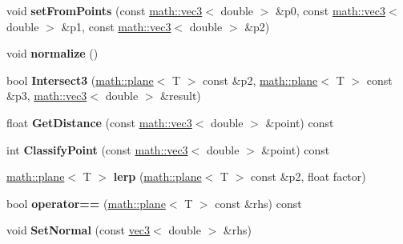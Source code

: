 \begin{DoxyCompactItemize}
\item 
\hypertarget{classmath_1_1plane_abeb813bf61a05280b9249a04f52f2d35}{
void {\bfseries setFromPoints} (const \hyperlink{classmath_1_1vec3}{math::vec3}$<$ double $>$ \&p0, const \hyperlink{classmath_1_1vec3}{math::vec3}$<$ double $>$ \&p1, const \hyperlink{classmath_1_1vec3}{math::vec3}$<$ double $>$ \&p2)}
\label{classmath_1_1plane_abeb813bf61a05280b9249a04f52f2d35}

\item 
\hypertarget{classmath_1_1plane_a0a5b678ea4760a4ce66d74ffa4daa1b3}{
void {\bfseries normalize} ()}
\label{classmath_1_1plane_a0a5b678ea4760a4ce66d74ffa4daa1b3}

\item 
\hypertarget{classmath_1_1plane_a1ceb4cac52134338f0676d8ef673cd25}{
bool {\bfseries Intersect3} (\hyperlink{classmath_1_1plane}{math::plane}$<$ T $>$ const \&p2, \hyperlink{classmath_1_1plane}{math::plane}$<$ T $>$ const \&p3, \hyperlink{classmath_1_1vec3}{math::vec3}$<$ double $>$ \&result)}
\label{classmath_1_1plane_a1ceb4cac52134338f0676d8ef673cd25}

\item 
\hypertarget{classmath_1_1plane_a080c90391f1bbbcb0d6dd5f38f93dcef}{
float {\bfseries GetDistance} (const \hyperlink{classmath_1_1vec3}{math::vec3}$<$ double $>$ \&point) const }
\label{classmath_1_1plane_a080c90391f1bbbcb0d6dd5f38f93dcef}

\item 
\hypertarget{classmath_1_1plane_a8aaf4209abcb40bfb26d0758ca75b1dc}{
int {\bfseries ClassifyPoint} (const \hyperlink{classmath_1_1vec3}{math::vec3}$<$ double $>$ \&point) const }
\label{classmath_1_1plane_a8aaf4209abcb40bfb26d0758ca75b1dc}

\item 
\hypertarget{classmath_1_1plane_ad27986efeef8b0e84e49cc9d36d4df3e}{
\hyperlink{classmath_1_1plane}{math::plane}$<$ T $>$ {\bfseries lerp} (\hyperlink{classmath_1_1plane}{math::plane}$<$ T $>$ const \&p2, float factor)}
\label{classmath_1_1plane_ad27986efeef8b0e84e49cc9d36d4df3e}

\item 
\hypertarget{classmath_1_1plane_a528891f0e9a349866fea78db396286d8}{
bool {\bfseries operator==} (\hyperlink{classmath_1_1plane}{math::plane}$<$ T $>$ const \&rhs) const }
\label{classmath_1_1plane_a528891f0e9a349866fea78db396286d8}

\item 
\hypertarget{classmath_1_1plane_ae6777af8e7215c0bffa0d2f5ac327440}{
void {\bfseries SetNormal} (const \hyperlink{classmath_1_1vec3}{vec3}$<$ double $>$ \&rhs)}
\label{classmath_1_1plane_ae6777af8e7215c0bffa0d2f5ac327440}


\end{DoxyCompactItemize}
